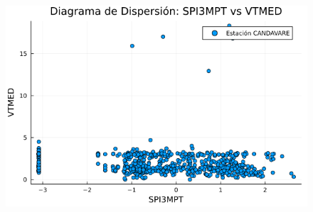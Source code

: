 \begin{figure}[htbp]
\begin{minipage}{0.32\textwidth}
    \includegraphics[width=\linewidth]{Capitulos/Scaterplot/CANDAVARE_SPI3MPT_vs_VTMED.png}
\end{minipage}

\vspace{0.5cm}  %


\end{figure}
